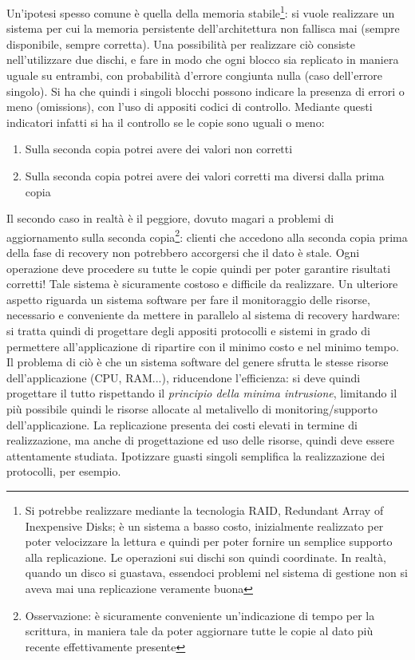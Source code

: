 Un'ipotesi spesso comune è quella della memoria stabile\footnote{Si potrebbe 
realizzare mediante la tecnologia RAID,
Redundant Array of Inexpensive Disks; è un sistema a basso costo, inizialmente 
realizzato per poter velocizzare la
lettura e quindi per poter fornire un semplice supporto alla replicazione. Le 
operazioni sui dischi son quindi
coordinate. In realtà, quando un disco si guastava, essendoci problemi nel 
sistema di gestione non si aveva mai una
replicazione veramente buona}: si vuole realizzare un sistema per cui la 
memoria persistente dell'architettura non
fallisca mai (sempre disponibile, sempre corretta). Una possibilità per 
realizzare ciò consiste nell'utilizzare due
dischi, e fare in modo che ogni blocco sia replicato in maniera uguale su 
entrambi, con probabilità d'errore congiunta
nulla (caso dell'errore singolo). Si ha che quindi i singoli blocchi possono 
indicare la presenza di errori o meno
(omissions), con l'uso di appositi codici di controllo. Mediante questi 
indicatori infatti si ha il controllo se le
copie sono uguali o meno:
\begin{enumerate}
 \item Sulla seconda copia potrei avere dei valori non corretti
 \item Sulla seconda copia potrei avere dei valori corretti ma diversi dalla 
prima copia
\end{enumerate}
Il secondo caso in realtà è il peggiore, dovuto magari a problemi di 
aggiornamento sulla seconda
copia\footnote{Osservazione: è sicuramente conveniente un'indicazione di tempo 
per la scrittura, in maniera tale da
poter aggiornare tutte le copie al dato più recente effettivamente presente}: 
clienti che accedono alla seconda copia
prima della fase di recovery non potrebbero accorgersi che il dato è stale. 
Ogni operazione deve procedere su tutte le
copie quindi per poter garantire risultati corretti! Tale sistema è sicuramente 
costoso e difficile da realizzare.
Un ulteriore aspetto riguarda un sistema software per fare il monitoraggio
delle risorse, necessario e conveniente da mettere in parallelo al sistema di
recovery hardware: si tratta quindi di progettare degli appositi protocolli e
sistemi in grado di permettere all'applicazione di ripartire con il minimo costo
e nel minimo tempo. Il problema di ciò è che un sistema software del genere
sfrutta le stesse risorse dell'applicazione (CPU, RAM...), riducendone
l'efficienza: si deve quindi progettare il tutto rispettando il
\textit{principio della minima intrusione}, limitando il più possibile quindi le
risorse allocate al metalivello di monitoring/supporto dell'applicazione. La
replicazione presenta dei costi elevati in termine di realizzazione, ma anche di
progettazione ed uso delle risorse, quindi deve essere attentamente studiata.
Ipotizzare guasti singoli semplifica la realizzazione dei protocolli, per
esempio.

